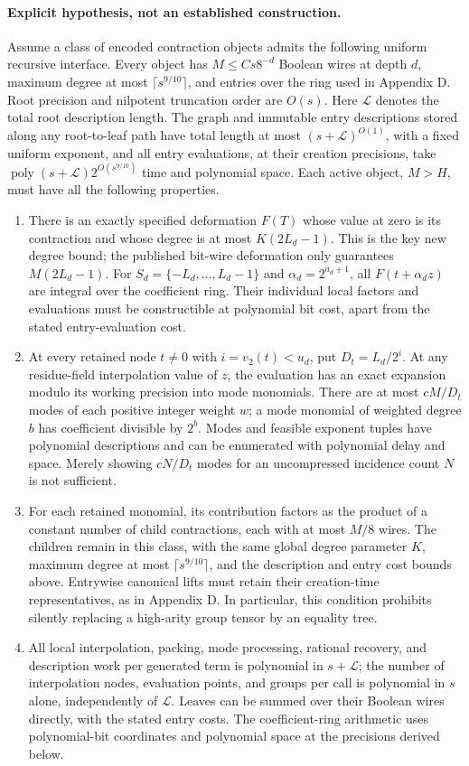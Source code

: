 \paragraph{Explicit hypothesis, not an established construction.}
Assume a class of encoded contraction objects admits the following uniform
recursive interface. Every object has $M\le Cs8^{-d}$ Boolean wires at depth $d$,
maximum degree at most $\lceil s^{9/10}\rceil$, and entries over the ring used in
Appendix D. Root precision and nilpotent truncation order are $O(s)$.
Here $\mathcal L$ denotes the total root description length. The graph and
immutable entry descriptions stored along any root-to-leaf path have total
length at most $(s+\mathcal L)^{O(1)}$, with a fixed uniform exponent, and all
entry evaluations, at their creation precisions, take
$\operatorname{poly}(s+\mathcal L)2^{O(s^{9/10})}$ time and polynomial space.
Each active object, $M>H$, must have all the following properties.
\begin{enumerate}
\item There is an exactly specified deformation $F(T)$ whose value at zero
is its contraction and whose degree is at most $K(2L_d-1)$. This is the key
new degree bound; the published bit-wire deformation only guarantees
$M(2L_d-1)$. For $S_d=\{-L_d,\ldots,L_d-1\}$ and
$\alpha_d=2^{a_d+1}$, all $F(t+\alpha_d z)$ are integral over the coefficient
ring. Their individual local factors and evaluations must be constructible
at polynomial bit cost, apart from the stated entry-evaluation cost.
\item At every retained node $t\ne0$ with $i=v_2(t)<u_d$, put
$D_t=L_d/2^i$. At any residue-field interpolation value of $z$, the evaluation
has an exact expansion modulo its working precision into mode monomials.
There are at most $cM/D_t$ modes of each positive integer weight $w$;
a mode monomial of weighted degree $b$ has coefficient divisible by $2^b$.
Modes and feasible exponent tuples have polynomial descriptions and can be
enumerated with polynomial delay and space. Merely showing $cN/D_t$ modes
for an uncompressed incidence count $N$ is not sufficient.
\item For each retained monomial, its contribution factors as the product
of a constant number of child contractions, each with at most $M/8$ wires.
The children remain in this class, with the same global degree parameter $K$,
maximum degree at most $\lceil s^{9/10}\rceil$, and the description and entry
cost bounds above. Entrywise canonical lifts must retain their creation-time
representatives, as in Appendix D. In particular, this condition prohibits
silently replacing a high-arity group tensor by an equality tree.
\item All local interpolation, packing, mode processing, rational recovery,
and description work per generated term is polynomial in $s+\mathcal L$;
the number of interpolation nodes, evaluation points, and groups per call
is polynomial in $s$ alone, independently of $\mathcal L$. Leaves can be summed over their Boolean wires directly, with the
stated entry costs. The coefficient-ring arithmetic uses polynomial-bit
coordinates and polynomial space at the precisions derived below.
\end{enumerate}

